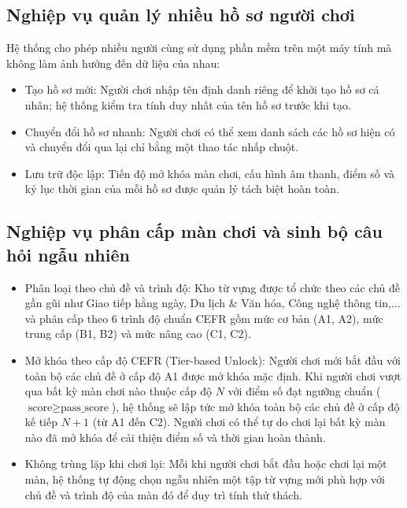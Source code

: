\subsection{Nghiệp vụ quản lý nhiều hồ sơ người chơi}
\label{subsec:profile_management}
Hệ thống cho phép nhiều người cùng sử dụng phần mềm trên một máy tính mà không làm ảnh hưởng đến dữ liệu của nhau:
\begin{itemize}
    \item Tạo hồ sơ mới: Người chơi nhập tên định danh riêng để khởi tạo hồ sơ cá nhân; hệ thống kiểm tra tính duy nhất của tên hồ sơ trước khi tạo.
    \item Chuyển đổi hồ sơ nhanh: Người chơi có thể xem danh sách các hồ sơ hiện có và chuyển đổi qua lại chỉ bằng một thao tác nhấp chuột.
    \item Lưu trữ độc lập: Tiến độ mở khóa màn chơi, cấu hình âm thanh, điểm số và kỷ lục thời gian của mỗi hồ sơ được quản lý tách biệt hoàn toàn.
\end{itemize}

\subsection{Nghiệp vụ phân cấp màn chơi và sinh bộ câu hỏi ngẫu nhiên}
\label{subsec:level_and_question_generation}
\begin{itemize}
    \item Phân loại theo chủ đề và trình độ: Kho từ vựng được tổ chức theo các chủ đề gần gũi như Giao tiếp hằng ngày, Du lịch \& Văn hóa, Công nghệ thông tin,... và phân cấp theo 6 trình độ chuẩn CEFR gồm mức cơ bản (A1, A2), mức trung cấp (B1, B2) và mức nâng cao (C1, C2).
    \item Mở khóa theo cấp độ CEFR (Tier-based Unlock): Người chơi mới bắt đầu với toàn bộ các chủ đề ở cấp độ A1 được mở khóa mặc định. Khi người chơi vượt qua bất kỳ màn chơi nào thuộc cấp độ $N$ với điểm số đạt ngưỡng chuẩn ($\text{score} \ge \text{pass\_score}$), hệ thống sẽ lập tức mở khóa toàn bộ các chủ đề ở cấp độ kế tiếp $N+1$ (từ A1 đến C2). Người chơi có thể tự do chơi lại bất kỳ màn nào đã mở khóa để cải thiện điểm số và thời gian hoàn thành.
    \item Không trùng lặp khi chơi lại: Mỗi khi người chơi bắt đầu hoặc chơi lại một màn, hệ thống tự động chọn ngẫu nhiên một tập từ vựng mới phù hợp với chủ đề và trình độ của màn đó để duy trì tính thử thách.
\end{itemize}

